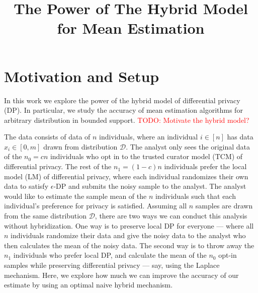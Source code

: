 \documentclass{article}
\title{The Power of The Hybrid Model for Mean Estimation}
\newcommand{\todo}[1]{\textcolor{red}{TODO: {#1}}}
\theoremstyle{plain}
\begin{document}
\maketitle

\begin{abstract}
\end{abstract}

\section{Motivation and Setup}

In this work we explore the power of the hybrid model \cite{blender} of differential privacy (DP). In particular, we study the accuracy of mean estimation algorithms for arbitrary distribution in bounded support. \todo{Motivate the hybrid model?}

The data consists of data of $n$ individuals, where an individual $i \in [n]$ has data $x_i \in [0, m]$ drawn from distribution $\mathcal{D}$. The analyst only sees the original data of the $n_0 = c n$ individuals who opt in to the trusted curator model (TCM) of differential privacy. The rest of the $n_1 = (1-c) n$ individuals prefer the local model (LM) of differential privacy, where each individual randomizes their own data to satisfy $\epsilon$-DP and submits the noisy sample to the analyst. The analyst would like to estimate the sample mean of the $n$ individuals such that each individual's preference for privacy is satisfied. Assuming all $n$ samples are drawn from the same distribution $\mathcal{D}$, there are two ways we can conduct this analysis without hybridization. One way is to preserve local DP for everyone — where all $n$ individuals randomize their data and give the noisy data to the analyst who then calculates the mean of the noisy data. The second way is to throw away the $n_1$ individuals who prefer local DP, and calculate the mean of the $n_0$ opt-in samples while preserving differential privacy — say, using the Laplace mechanism. Here, we explore how much we can improve the accuracy of our estimate by using an optimal naive hybrid mechanism. 
\end{document}
